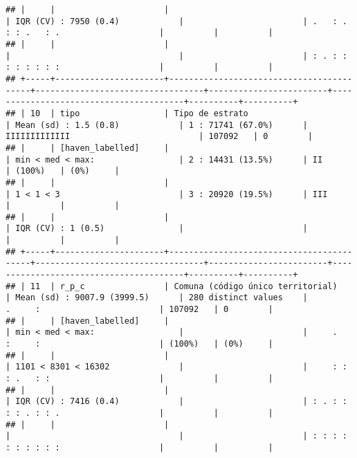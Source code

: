 \documentclass[]{article}
\begin{document}
\begin{verbatim}
## |     |                      |                                          | IQR (CV) : 7950 (0.4)            |                        | .   : . : : .   : .                    |          |          |
## |     |                      |                                          |                                  |                        | : . : : : : : : : :                    |          |          |
## +-----+----------------------+------------------------------------------+----------------------------------+------------------------+----------------------------------------+----------+----------+
## | 10  | tipo                 | Tipo de estrato                          | Mean (sd) : 1.5 (0.8)            | 1 : 71741 (67.0%)      | IIIIIIIIIIIII                          | 107092   | 0        |
## |     | [haven_labelled]     |                                          | min < med < max:                 | 2 : 14431 (13.5%)      | II                                     | (100%)   | (0%)     |
## |     |                      |                                          | 1 < 1 < 3                        | 3 : 20920 (19.5%)      | III                                    |          |          |
## |     |                      |                                          | IQR (CV) : 1 (0.5)               |                        |                                        |          |          |
## +-----+----------------------+------------------------------------------+----------------------------------+------------------------+----------------------------------------+----------+----------+
## | 11  | r_p_c                | Comuna (código único territorial)        | Mean (sd) : 9007.9 (3999.5)      | 280 distinct values    |         .     :                        | 107092   | 0        |
## |     | [haven_labelled]     |                                          | min < med < max:                 |                        |     .   :     :                        | (100%)   | (0%)     |
## |     |                      |                                          | 1101 < 8301 < 16302              |                        |     : : : .   : :                      |          |          |
## |     |                      |                                          | IQR (CV) : 7416 (0.4)            |                        | : . : : : : . : : .                    |          |          |
## |     |                      |                                          |                                  |                        | : : : : : : : : : :                    |          |          |

\end{verbatim}
\end{document}
